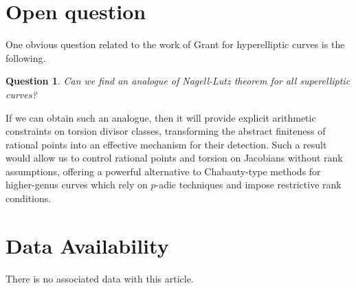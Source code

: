 \documentclass[12pt, reqno]{amsart}
\newtheorem{question}[thm]{Question}
\numberwithin{equation}{section}
\theoremstyle{definition}
\theoremstyle{nodefstyle}
\begin{document}
\section{Open question}\label{sec:open}
One obvious question related to the work of Grant \cite{Grant2013} for hyperelliptic curves is the following.
\begin{question}
Can we find an analogue of Nagell-Lutz theorem for all superelliptic curves? 
\end{question}
If we can obtain such an analogue, then it will provide explicit
arithmetic constraints on torsion divisor classes, transforming the abstract finiteness
of rational points into an effective mechanism for their detection. Such a result would
allow us to control rational points and torsion on Jacobians without rank assumptions,
offering a powerful alternative to Chabauty-type methods \cite{McCallumPoonen2010} for higher-genus curves which rely on $p$-adic techniques and impose restrictive rank conditions.

\section{Data Availability} There is no associated data with this article.

\end{document}
